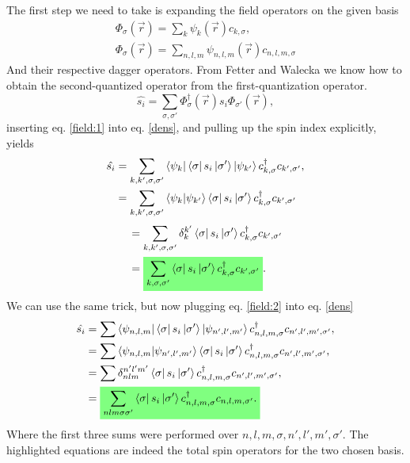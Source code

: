 \begin{questions}
\begin{solution}
 The first step we need to take is expanding the field operators on the given basis
 \begin{eqnarray}
   \Phi_{\sigma}(\vec{r}) = \sum_{k} \psi_{k}(\vec{r})c_{k,\sigma},\label{field:1}\\
   \Phi_{\sigma}(\vec{r}) = \sum_{n,l,m} \psi_{n,l,m}(\vec{r})c_{n,l,m,\sigma}\label{field:2}
 \end{eqnarray}
 And their respective dagger operators. From Fetter and Walecka we know how to obtain the second-quantized operator from the first-quantization operator.
 \begin{equation}
   \hat{s_i} = \sum_{\sigma,\sigma'} \Phi_\sigma^\dagger(\vec{r})s_i\Phi_{\sigma'}(\vec{r}),\label{dens}
 \end{equation}
 inserting eq. \ref{field:1} into eq. \ref{dens}, and pulling up the spin index explicitly, yields
 \begin{equation*}
   \begin{aligned}[b]
     \hat{s_i} &= \sum_{k,k',\sigma, \sigma'} \bra{\psi_{k}}\bra{\sigma} s_i  \ket{\sigma'}\ket{\psi_{k'}}c^\dagger_{k,\sigma}c_{k',\sigma'},\\
     &= \sum_{k,k',\sigma, \sigma'} \braket{\psi_{k}|\psi_{k'}}\bra{\sigma} s_i  \ket{\sigma'}c^\dagger_{k,\sigma}c_{k',\sigma'}
   \end{aligned}
 \end{equation*}
 \begin{equation}
   \begin{aligned}[b]
     &= \sum_{k,k',\sigma, \sigma'} \delta_k^{k'}\bra{\sigma} s_i  \ket{\sigma'}c^\dagger_{k,\sigma}c_{k',\sigma'}\\
     &= \hlgreen{\sum_{k,\sigma, \sigma'}\bra{\sigma} s_i  \ket{\sigma'}c^\dagger_{k,\sigma}c_{k',\sigma'}}.
   \end{aligned}
 \end{equation}
 We can use the same trick, but now plugging eq. \ref{field:2} into eq. \ref{dens}
 \begin{equation}
   \begin{aligned}[b]
     \hat{s_i} &= \sum \bra{\psi_{n,l,m}}\bra{\sigma} s_i  \ket{\sigma'}\ket{\psi_{n',l',m'}}c^\dagger_{n,l,m,\sigma}c_{n',l',m',\sigma'},\\
     &= \sum \braket{\psi_{n,l,m}|\psi_{n',l',m'}}\bra{\sigma} s_i  \ket{\sigma'}c^\dagger_{n,l,m,\sigma}c_{n',l',m',\sigma'},\\
     &= \sum \delta_{nlm}^{n'l'm'}\bra{\sigma} s_i  \ket{\sigma'}c^\dagger_{n,l,m,\sigma}c_{n',l',m',\sigma'},\\
     &= \hlgreen{\sum_{nlm\sigma\sigma'} \bra{\sigma} s_i  \ket{\sigma'}c^\dagger_{n,l,m,\sigma}c_{n,l,m,\sigma'}.}
   \end{aligned}
 \end{equation}
 Where the first three sums were performed over $n,l,m,\sigma,n',l',m',\sigma'$. The highlighted equations are indeed the total spin operators for the two chosen basis.
\end{solution}
\end{questions}
